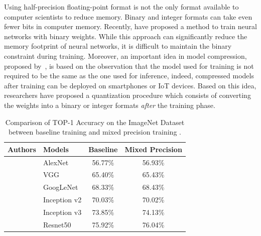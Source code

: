 Using half-precision floating-point format is not the only format available to computer scientists to reduce memory.
Binary and integer formats can take even fewer bits in computer memory.
Recently, \citet{courbariaux2015binaryconnect} have proposed a method to train neural networks with binary weights.
While this approach can significantly reduce the memory footprint of neural networks, it is difficult to maintain the binary constraint during training. 
Moreover, an important idea in model compression, proposed by~\citet{bucilua2006model}, is based on the observation that the model used for training is not required to be the same as the one used for inference, indeed, compressed models after training can be deployed on smartphones or IoT devices.
Based on this idea, researchers \cite{mellempudi2017ternary,rastegariECCV16} have proposed a quantization procedure which consists of converting the weights into a binary or integer formats \emph{after} the training phase. 

\begin{table}[t]
  \centering
  {\small
  \begin{tabular}{llcc}
    \toprule
    \textbf{Authors} & \textbf{Models} & \textbf{Baseline} & \textbf{Mixed Precision} \\
    \midrule
    \citet{krizhevsky2012imagenet} & AlexNet & 56.77\% & 56.93\% \\
    \citet{simonyan2014very} & VGG & 65.40\% & 65.43\% \\
    \citet{szegedy2015going} & GoogLeNet & 68.33\% & 68.43\% \\
    \citet{ioffe2015batch} & Inception v2 & 70.03\% & 70.02\% \\
    \citet{szegedy2016rethinking} & Inception v3 & 73.85\% & 74.13\% \\
    \citet{he2016deep} & Resnet50 & 75.92\% & 76.04\% \\
    \bottomrule
  \end{tabular}
  }
  \caption{Comparison of TOP-1 Accuracy on the ImageNet Dataset \cite{deng2009imagenet} between baseline training and mixed precision training \cite{micikevicius2018mixed}.}
  \label{table:p1-ch3-basline_vs_mixed_precision}
\end{table}

